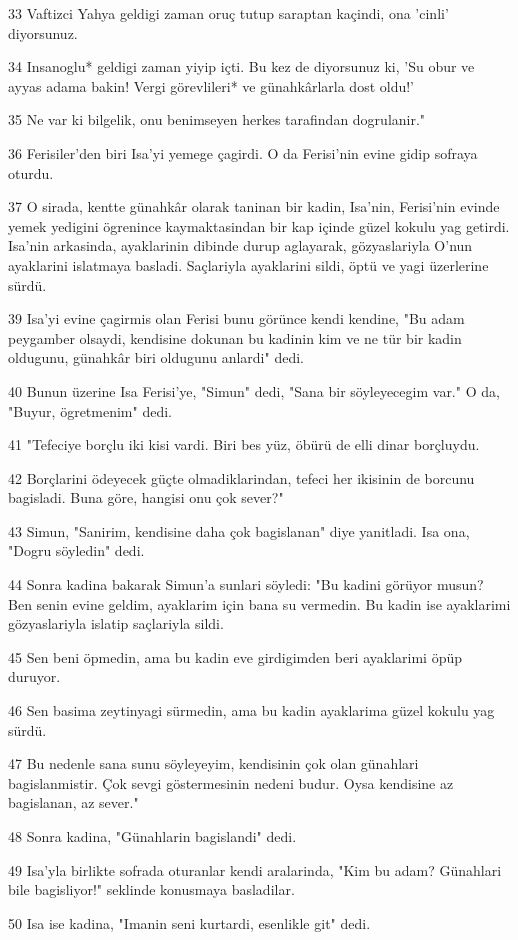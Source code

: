 \par 33 Vaftizci Yahya geldigi zaman oruç tutup saraptan kaçindi, ona 'cinli' diyorsunuz.
\par 34 Insanoglu* geldigi zaman yiyip içti. Bu kez de diyorsunuz ki, 'Su obur ve ayyas adama bakin! Vergi görevlileri* ve günahkârlarla dost oldu!'
\par 35 Ne var ki bilgelik, onu benimseyen herkes tarafindan dogrulanir."
\par 36 Ferisiler'den biri Isa'yi yemege çagirdi. O da Ferisi'nin evine gidip sofraya oturdu.
\par 37 O sirada, kentte günahkâr olarak taninan bir kadin, Isa'nin, Ferisi'nin evinde yemek yedigini ögrenince kaymaktasindan bir kap içinde güzel kokulu yag getirdi. Isa'nin arkasinda, ayaklarinin dibinde durup aglayarak, gözyaslariyla O'nun ayaklarini islatmaya basladi. Saçlariyla ayaklarini sildi, öptü ve yagi üzerlerine sürdü.
\par 39 Isa'yi evine çagirmis olan Ferisi bunu görünce kendi kendine, "Bu adam peygamber olsaydi, kendisine dokunan bu kadinin kim ve ne tür bir kadin oldugunu, günahkâr biri oldugunu anlardi" dedi.
\par 40 Bunun üzerine Isa Ferisi'ye, "Simun" dedi, "Sana bir söyleyecegim var." O da, "Buyur, ögretmenim" dedi.
\par 41 "Tefeciye borçlu iki kisi vardi. Biri bes yüz, öbürü de elli dinar borçluydu.
\par 42 Borçlarini ödeyecek güçte olmadiklarindan, tefeci her ikisinin de borcunu bagisladi. Buna göre, hangisi onu çok sever?"
\par 43 Simun, "Sanirim, kendisine daha çok bagislanan" diye yanitladi. Isa ona, "Dogru söyledin" dedi.
\par 44 Sonra kadina bakarak Simun'a sunlari söyledi: "Bu kadini görüyor musun? Ben senin evine geldim, ayaklarim için bana su vermedin. Bu kadin ise ayaklarimi gözyaslariyla islatip saçlariyla sildi.
\par 45 Sen beni öpmedin, ama bu kadin eve girdigimden beri ayaklarimi öpüp duruyor.
\par 46 Sen basima zeytinyagi sürmedin, ama bu kadin ayaklarima güzel kokulu yag sürdü.
\par 47 Bu nedenle sana sunu söyleyeyim, kendisinin çok olan günahlari bagislanmistir. Çok sevgi göstermesinin nedeni budur. Oysa kendisine az bagislanan, az sever."
\par 48 Sonra kadina, "Günahlarin bagislandi" dedi.
\par 49 Isa'yla birlikte sofrada oturanlar kendi aralarinda, "Kim bu adam? Günahlari bile bagisliyor!" seklinde konusmaya basladilar.
\par 50 Isa ise kadina, "Imanin seni kurtardi, esenlikle git" dedi.

